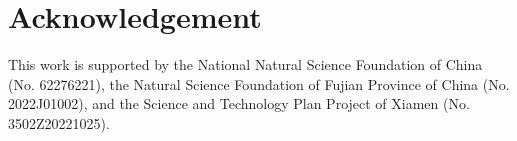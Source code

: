 \documentclass[runningheads]{llncs}
\begin{document}
\section*{Acknowledgement}
This work is supported by the National Natural Science Foundation of China (No. 62276221), the Natural Science Foundation of Fujian Province of China (No. 2022J01002), and the Science and Technology Plan Project of Xiamen (No. 3502Z20221025).



\end{document}
